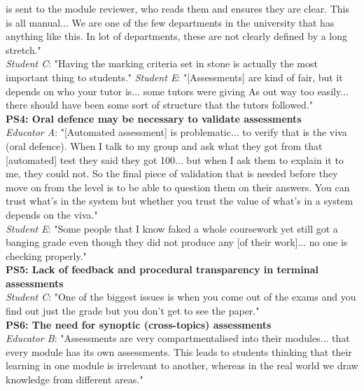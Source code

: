 is sent to the module reviewer, who reads them and ensures they are clear. This is all manual... 
We are one of the few departments in the university that has anything like this. In lot of departments, 
these are not clearly defined by a long stretch."\\
\textit{Student C}: "Having the marking criteria set in stone is actually the most important thing 
to students."
\textit{Student E}: "[Assessments] are kind of fair, but it depends on who your tutor is... 
some tutors were giving As out way too easily... there should have been some sort of structure that 
the tutors followed."
\vspace{0.25cm}\\
\textbf{PS4: Oral defence may be necessary to validate assessments}\\
\textit{Educator A}: "[Automated assessment] is problematic... to verify that is the viva (oral defence).
When I talk to my group and ask what they got from that [automated] test they said they got 100... 
but when I ask them to explain it to me, they could not. So the final piece of validation that is needed
before they move on from the level is to be able to question them on their answers. You can trust 
what's in the system but whether you trust the value of what's in a system depends on the viva."\\
\textit{Student E}: "Some people that I know faked a whole coursework yet still got a banging grade 
even though they did not produce any [of their work]... no one is checking properly."
\vspace{0.25cm}\\
\textbf{PS5: Lack of feedback and procedural transparency in terminal assessments}\\
\textit{Student C}: "One of the biggest issues is when you come out of the exams and you find out 
just the grade but you don't get to see the paper."
\vspace{0.25cm}\\
\textbf{PS6: The need for synoptic (cross-topics) assessments}\\
\textit{Educator B}: "Assessments are very compartmentalised into their modules... that every module has 
its own assessments. This leads to students thinking that their learning in one module is irrelevant 
to another, whereas in the real world we draw knowledge from different areas."

